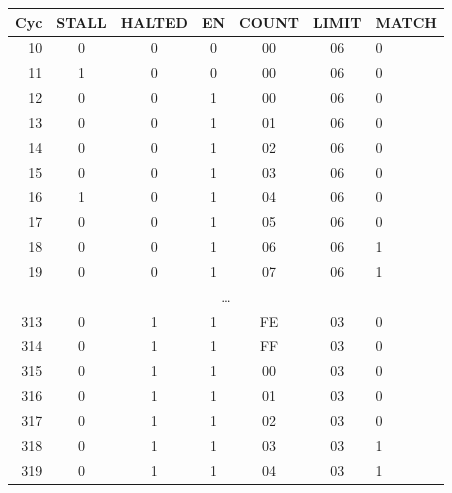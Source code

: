 \begin{tabular}{rcccccl}\toprule Cyc & STALL & HALTED & EN & COUNT & LIMIT & MATCH \\ \midrule
10 & 0 & 0 & 0 & 00 & 06 & 0 \\
11 & 1 & 0 & 0 & 00 & 06 & 0 \\
12 & 0 & 0 & 1 & 00 & 06 & 0 \\
13 & 0 & 0 & 1 & 01 & 06 & 0 \\
14 & 0 & 0 & 1 & 02 & 06 & 0 \\
15 & 0 & 0 & 1 & 03 & 06 & 0 \\
16 & 1 & 0 & 1 & 04 & 06 & 0 \\
17 & 0 & 0 & 1 & 05 & 06 & 0 \\
18 & 0 & 0 & 1 & 06 & 06 & 1 \\
19 & 0 & 0 & 1 & 07 & 06 & 1 \\
\midrule \multicolumn{7}{c}{\dots} \\ \midrule
313 & 0 & 1 & 1 & FE & 03 & 0 \\
314 & 0 & 1 & 1 & FF & 03 & 0 \\
315 & 0 & 1 & 1 & 00 & 03 & 0 \\
316 & 0 & 1 & 1 & 01 & 03 & 0 \\
317 & 0 & 1 & 1 & 02 & 03 & 0 \\
318 & 0 & 1 & 1 & 03 & 03 & 1 \\
319 & 0 & 1 & 1 & 04 & 03 & 1 \\
\bottomrule\end{tabular}
